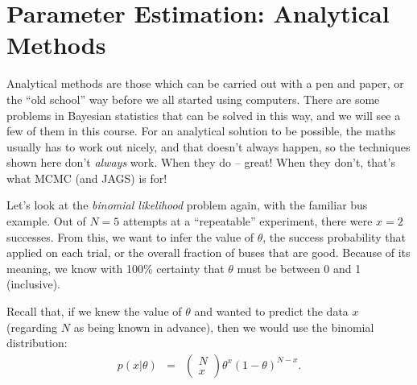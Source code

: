 \chapter{Parameter Estimation: Analytical Methods}
Analytical methods are those which can be carried out with a pen and paper,
or the ``old school'' way before we all started using computers. There are some
problems in Bayesian statistics that can be solved in this way, and we will
see a few of them in this course. For an analytical solution to be possible, the
maths usually has to work out nicely, and that doesn't always happen, so
the techniques shown here don't {\it always} work. When they do -- great! When
they don't, that's what MCMC (and JAGS) is for!

Let's look at the {\it binomial likelihood} problem again, with the familiar
bus example. Out of $N=5$ attempts at a ``repeatable'' experiment, there were
$x=2$ successes. From this, we want to infer the value of $\theta$, the
success probability that applied on each trial, or the overall fraction of 
buses that are good. Because of its meaning, we know
with 100\% certainty that $\theta$ must be between 0 and 1 (inclusive).

Recall that, if we knew the
value of $\theta$ and wanted to predict the data $x$ (regarding $N$ as being
known in advance), then we would use the binomial distribution:
\begin{eqnarray}
p(x|\theta) &=& \left(\begin{array}{c}N \\ x\end{array}\right)
\theta^x\left(1-\theta\right)^{N - x}.\label{eq:binomial_likelihood}
\end{eqnarray}

